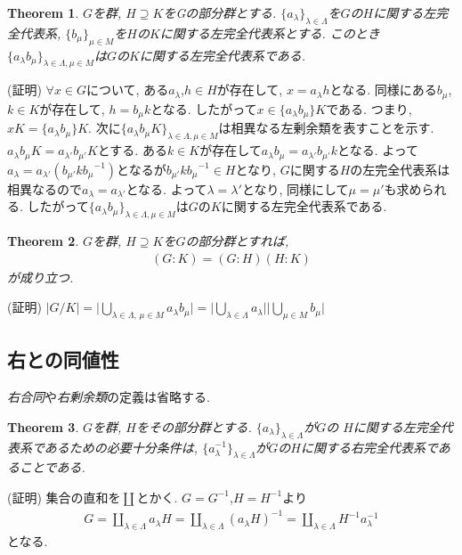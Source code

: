 \documentclass{article}
\theoremstyle{plain}
\newtheorem{theorem}{Theorem}
\theoremstyle{definition}
\theoremstyle{plain}
\numberwithin{equation}{section}
\numberwithin{theorem}{section}
\numberwithin{definition}{section}
\numberwithin{note}{section}
\begin{document}
\begin{theorem}
     $G$を群, $H\supseteq K$をGの部分群とする. $\lbrace a_\lambda \rbrace_{\lambda \in \Lambda}$を$G$の$H$に関する左完全代表系, $\lbrace b_\mu \rbrace_{\mu \in M}$を$H$の$K$に関する左完全代表系とする. このとき$\lbrace a_\lambda b_\mu\rbrace_{\lambda\in \Lambda,\mu\in M}$は$G$の$K$に関する左完全代表系である.
\end{theorem}
(証明) $\forall x\in G$について, ある$a_\lambda$,$h\in H$が存在して, $x=a_\lambda h$となる. 同様にある$b_\mu$,$k\in K$が存在して, $h=b_\mu k$となる. したがって$x\in \lbrace a_\lambda b_\mu\rbrace K$である. つまり, $xK= \lbrace a_\lambda b_\mu\rbrace K$. 次に$\lbrace a_\lambda b_\mu K\rbrace_{\lambda\in \Lambda,\mu\in M}$は相異なる左剰余類を表すことを示す.
$a_\lambda b_\mu K=a_{\lambda'}b_{\mu'}K$とする. ある$k\in K$が存在して$a_\lambda b_\mu=a_{\lambda'}b_{\mu'}k$となる. よって$a_\lambda=a_{\lambda'}(b_{\mu'}k{b_\mu}^{-1})$となるが$b_{\mu'}k{b_\mu}^{-1}\in H$となり, $G$に関する$H$の左完全代表系は相異なるので$a_\lambda=a_{\lambda'}$となる. よって$\lambda=\lambda'$となり, 同様にして$\mu=\mu'$も求められる. したがって$\lbrace a_\lambda b_\mu\rbrace_{\lambda\in \Lambda,\mu\in M}$は$G$の$K$に関する左完全代表系である. 
\begin{theorem}
     $G$を群, $H\supseteq K$を$G$の部分群とすれば,
     \begin{align}
          (G:K)=(G:H)(H:K)
     \end{align}
     が成り立つ.
\end{theorem}
(証明) $\lvert G/K\rvert =\lvert \bigcup_{\lambda\in \Lambda,\,\mu\in M}a_\lambda b_\mu\rvert=\lvert \bigcup_{\lambda\in \Lambda}a_\lambda\rvert\lvert \bigcup_{\mu\in M}b_\mu\rvert$

\subsection{右との同値性}
\emph{右合同}や\emph{右剰余類}の定義は省略する.
\begin{theorem}
     $G$を群, $H$をその部分群とする. $\lbrace a_\lambda\rbrace_{\lambda\in \Lambda}$が$G$の
     $H$に関する左完全代表系であるための必要十分条件は, $\lbrace a_\lambda^{-1}\rbrace_{\lambda\in \Lambda}$が$G$の$H$に関する右完全代表系であることである.
\end{theorem}
(証明) 集合の直和を$\coprod$とかく. $G=G^{-1}$,$H=H^{-1}$より
\begin{align}
     G=\coprod_{\lambda\in \Lambda}a_\lambda H=\coprod_{\lambda\in \Lambda}(a_\lambda H)^{-1}=\coprod_{\lambda\in \Lambda}H^{-1}a_\lambda^{-1}
\end{align}
となる.
\end{document}
